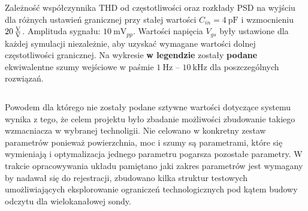 \begin{frame}[t]
\begin{columns}

        {\renewcommand\normalsize{\small}%
        \normalsize
        Zależność współczynnika THD od częstotliwości oraz rozkłady PSD na wyjściu dla różnych ustawień granicznej przy stałej wartości $C_{in} = \SI{4}{\pico\farad}$ i wzmocnieniu $\SI{20}{\frac{\volt}{\volt}}$.
            Amplituda sygnału: $\SI{10}{\milli\volt_{pp}}$.
            Wartości napięcia $V_{gs} $ były ustawione dla każdej symulacji niezależnie, aby uzyskać wymagane wartości dolnej częstotliwości granicznej.  
            Na wykresie \textbf{w legendzie} zostały \textbf{podane} ekwiwalentne szumy wejściowe w paśmie $\SI{1}{\hertz}$ -- $\SI{10}{\kilo\hertz}$ dla poszczególnych rozwiązań.
        }
    
    \end{columns}

\end{frame}

\begin{frame}[t]
    
\end{frame}




\begin{frame}[t]
    \vspace{-1em}
    \begin{block}{\af}
    \end{block}
    {\renewcommand\normalsize{\small}%
\normalsize
Powodem dla którego nie zostały podane sztywne wartości dotyczące systemu wynika z tego, że celem projektu było zbadanie możliwości zbudowanie takiego wzmacniacza w wybranej technoligii. Nie celowano w konkretny zestaw parametrów ponieważ powierzchnia, moc i szumy są parametrami, które się wymieniają i optymalizacja jednego parametru pogarsza pozostałe parametry.
W trakcie opracowywania układu pamiętano jaki zakres parametrów jest wymagany by nadawał się do rejestracji,  zbudowano kilka struktur testowych umożliwiających eksplorowanie ograniczeń technologicznych pod kątem budowy odczytu dla wielokanałowej sondy. 

}


    
\end{frame}


